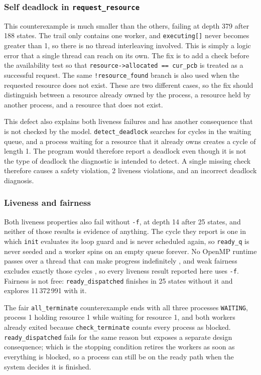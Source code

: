 \documentclass[10pt,a4paper]{article}
\newcommand{\code}[1]{\texttt{#1}}
\begin{document}
\subsubsection*{Self deadlock in \code{request\_resource}}

This counterexample is much smaller than the others, failing at depth 379 
after 188 states. The trail only contains one worker, and \code{executing[]} 
never becomes greater than 1, so there is no thread interleaving involved. 
This is simply a logic error that a single thread can reach on its own. The 
fix is to add a check before the availability test so that 
\code{resource->allocated == cur\_pcb} is treated as a successful request. 
The same \code{!resource\_found} branch is also used when the requested 
resource does not exist. These are two different cases, so the fix should 
distinguish between a resource already owned by the process, a resource held 
by another process, and a resource that does not exist.

This defect also explains both liveness failures and has another consequence 
that is not checked by the model. \code{detect\_deadlock} searches for cycles 
in the waiting queue, and a process waiting for a resource that it already 
owns creates a cycle of length 1. The program would therefore report a 
deadlock even though it is not the type of deadlock the diagnostic is 
intended to detect. A single missing check therefore causes a safety 
violation, 2 liveness violations, and an incorrect deadlock diagnosis.

\subsubsection*{Liveness and fairness}

Both liveness properties also fail without \code{-f}, at depth 14 after 25
states, and neither of those results is evidence of anything. The cycle they
report is one in which \code{init} evaluates its loop guard and is never
scheduled again, so \code{ready\_q} is never seeded and a worker spins on an
empty queue forever. No OpenMP runtime passes over a thread that can make
progress indefinitely \cite{openmp52}, and weak fairness excludes exactly
those cycles \cite{inggs_properties}, so every liveness result reported here
uses \code{-f}. Fairness is not free: \code{ready\_dispatched} finishes in 25
states without it and explores 11\,372\,991 with it.

The fair \code{all\_terminate} counterexample ends with all three processes
\code{WAITING}, process 1 holding resource 1 while waiting for resource 1, and
both workers already exited because \code{check\_terminate} counts every
process as blocked. \code{ready\_dispatched} fails for the same reason but
exposes a separate design consequence; which is the stopping condition retires the
workers as soon as everything is blocked, so a process can still be on the
ready path when the system decides it is finished.
\end{document}
